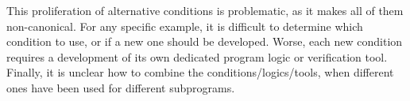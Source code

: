 This proliferation of alternative conditions is problematic, as it
makes all of them non-canonical. For any specific example, it is
difficult to determine which condition to use, or if a new one should
be developed. Worse, each new condition requires a development of its
own dedicated program logic or verification tool. Finally, it is
unclear how to combine the conditions/logics/tools, when different
ones have been used for different subprograms.


%
%

%
%


